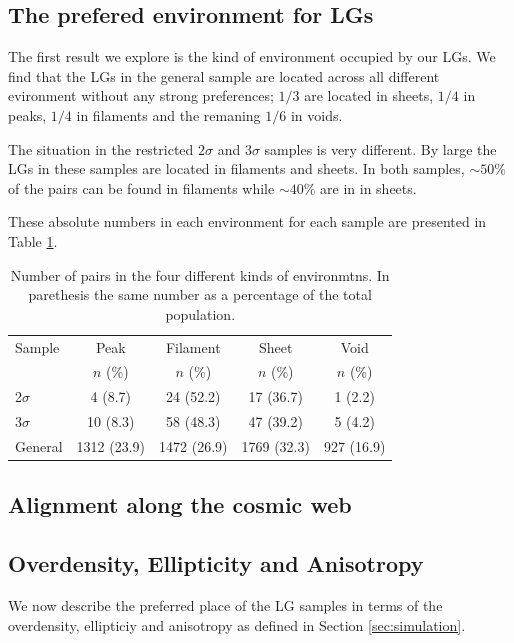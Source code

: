 \documentclass{emulateapj}
\begin{document}
\subsection{The prefered environment for LGs}

The first result we explore is the kind of environment occupied by
our LGs. We find that the LGs in the general sample are located across
all different evironment without any strong preferences; $1/3$  are
located in sheets, $1/4$ in peaks, $1/4$ in filaments and the remaning
$1/6$ in voids. 

The situation in the restricted $2\sigma$ and $3\sigma$ samples is very
different. By large the LGs in these samples are located in
filaments and sheets. In both samples, $\sim 50\%$ of the
pairs can be found in filaments while $\sim 40\%$ are in
in sheets. 

These absolute numbers in each environment for each sample are
presented in Table \ref{table:web_type}.


\begin{table}
\begin{center}
\begin{tabular}{lcccc}\hline\hline
Sample & Peak & Filament & Sheet & Void\\
       & $n$ (\%) & $n$ (\%) & $n$ (\%) & $n$ (\%) \\\hline
2$\sigma$ & 4 (8.7) & 24 (52.2) &  17 (36.7) & 1 (2.2)\\
3$\sigma$ & 10 (8.3) & 58 (48.3) & 47 (39.2) & 5 (4.2)\\  
General & 1312 (23.9) & 1472 (26.9) & 1769 (32.3) & 927 (16.9)\\\hline
\end{tabular}
\caption{
Number of pairs in the four different kinds of environmtns. In
parethesis the same number as a percentage of the
total population. 
\label{table:web_type}}
\end{center}
\end{table}

\subsection{Alignment along the cosmic web}


\subsection{Overdensity, Ellipticity and Anisotropy}


We now describe the preferred place of the LG samples in terms of the
overdensity, ellipticiy and anisotropy as defined in Section
\ref{sec:simulation}. 
\end{document}
